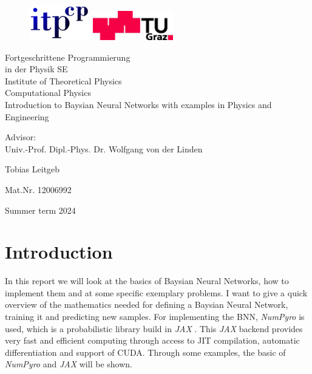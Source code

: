 \documentclass{article}
\newcommand{\bacc}{ Fortgeschrittene Programmierung \\ in der Physik SE}
\begin{document}
\begin{titlepage}
    \begin{figure}
    \includegraphics[width=3.cm]{logo-itp.png} \hfill
    \includegraphics[width=3.5cm]{logo-tu.png} \par
    \end{figure}
    
    \begin{center}
    {\huge\sc \bacc} \\ Institute of Theoretical Physics\\
    Computational Physics\\
    
    \vspace{5cm}
    {\huge\sc Introduction to Baysian Neural Networks with examples in Physics and Engineering} \par
    Advisor: \\ Univ.-Prof. Dipl.-Phys. Dr. Wolfgang von der Linden \\ 
    \vspace{5cm}
    
    {\Large\sc Tobias Leitgeb}
    
    {Mat.Nr. 12006992}
    
    \vspace{3cm}
    Summer term 2024
    \end{center}
    \end{titlepage}
\section{Introduction}
In this report we will look at the basics of Baysian Neural Networks, how to implement them and at some specific exemplary problems. I want to give a quick overview of the mathematics needed for defining a Baysian Neural Network, training it and predicting new samples. For implementing the BNN, \textit{NumPyro} \cite{bingham2019pyro, phan2019composable} is used, which is a probabilistic library build in \textit{JAX} \cite{jax2018github}. This \textit{JAX} backend provides very fast and efficient computing through access to JIT compilation, automatic differentiation and support of CUDA. Through some examples, the basic of \textit{NumPyro} and \textit{JAX} will be shown.
\end{document}
